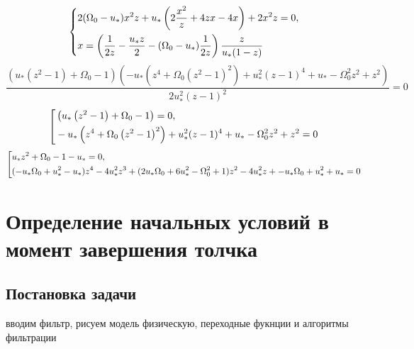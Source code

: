 \documentclass[a4paper,12pt, openany]{book}
\theoremstyle{plain} %
\theoremstyle{definition} %
\theoremstyle{remark} %
\numberwithin{equation}{chapter}
\begin{document}
{\begin{equation}
\end{equation}
\begin{equation}\label{fullchanged2}
    \left\{ {\begin{aligned}
                 & 2(\Omega_0-u_*)x^2z+u_*\left(2\frac{x^2}{z}+4zx-4x\right)+2x^2z=0, \hfill    \\
                 & x=\left( \frac{1}{2z}-\frac{u_*z}{2}-(\Omega_0-u_*)\frac{1}{2z}\right)\frac{z}{u_*(1-z)} \hfill    \\
            \end{aligned}} \right.
\end{equation}
\[
    \frac{\left(u_* \left(z^2-1\right)+\Omega _0-1\right) \left(-u_* \left(z^4+\Omega _0 \left(z^2-1\right)^2\right)+u_*^2 (z-1)^4+u_*-\Omega _0^2 z^2+z^2\right)}{2 u_*^2 (z-1)^2}=0
\]
\begin{equation}\label{fullchanged2}
    \left[ {\begin{aligned}
                 & \left(u_* \left(z^2-1\right)+\Omega _0-1\right)=0, \hfill    \\
                 & -u_* \left(z^4+\Omega _0 \left(z^2-1\right)^2\right)+u_*^2 (z-1)^4+u_*-\Omega _0^2 z^2+z^2=0 \hfill    \\
            \end{aligned}} \right.
\end{equation}
\begin{equation}\label{fullchanged2}
    \left[ {\begin{aligned}
                 & u_*z^2+\Omega _0-1-u_*=0, \hfill    \\
                 & (-u_* \Omega _0+u_*^2-u_*)z^4-4 u_*^2z^3+(2 u_* \Omega _0+6 u_*^2-\Omega _0^2+1)z^2-4 u_*^2z+-u_* \Omega _0+u_*^2+u_*=0 \hfill    \\
            \end{aligned}} \right.
\end{equation}




\newpage
\chapter{Определение начальных условий в момент завершения толчка}
\section{Постановка задачи}

вводим фильтр, рисуем модель физическую, переходные фукнции и алгоритмы фильтрации

}
\end{document}
